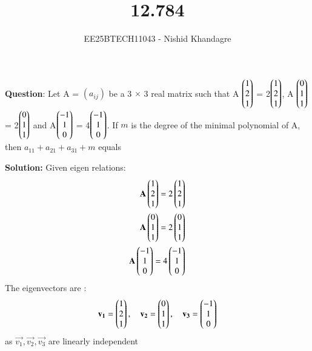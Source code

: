 \documentclass[journal]{IEEEtran}
\title{12.784}
\author{EE25BTECH11043 - Nishid Khandagre}
\begin{document}
\maketitle

\renewcommand{\thefigure}{\theenumi}
\renewcommand{\thetable}{\theenumi}


\textbf{Question}:
Let A = $(a_{ij})$ be a 3 $\times$ 3 real matrix such that
A $\begin{pmatrix}1\\2\\1\end{pmatrix}$ = 2$\begin{pmatrix}1\\2\\1\end{pmatrix}$, A $\begin{pmatrix}0\\1\\1\end{pmatrix}$ = 2$\begin{pmatrix}0\\1\\1\end{pmatrix}$ and A$\begin{pmatrix}-1\\1\\0\end{pmatrix}$ = 4$\begin{pmatrix}-1\\1\\0\end{pmatrix}$.
If $m$ is the degree of the minimal polynomial of A, then $a_{11} + a_{21} + a_{31} + m$ equals

\textbf{Solution: }
Given eigen relations:
\begin{align}
\mathbf{A} \begin{pmatrix}1\\2\\1\end{pmatrix} = 2\begin{pmatrix}1\\2\\1\end{pmatrix} \\
\mathbf{A} \begin{pmatrix}0\\1\\1\end{pmatrix} = 2\begin{pmatrix}0\\1\\1\end{pmatrix} \\
\mathbf{A} \begin{pmatrix}-1\\1\\0\end{pmatrix} = 4\begin{pmatrix}-1\\1\\0\end{pmatrix}
\end{align}
The eigenvectors are :
\begin{align}
\mathbf{v_1} = \begin{pmatrix}1\\2\\1\end{pmatrix}, \quad
\mathbf{v_2} = \begin{pmatrix}0\\1\\1\end{pmatrix}, \quad
\mathbf{v_3} = \begin{pmatrix}-1\\1\\0\end{pmatrix}
\end{align}
as $\vec{v_1},\vec{v_2},\vec{v_3}$ are linearly independent
\end{document}
